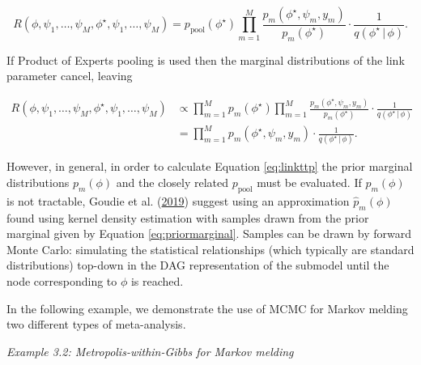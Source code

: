 \documentclass[11pt,]{book}
\begin{document}
\begin{equation}
R(\phi, \psi_1, \ldots, \psi_M, \phi^\star, \psi_1, \ldots, \psi_M) = p_{\mathrm{pool}}(\phi^\star) \prod_{m=1}^M \frac{p_m(\phi^\star, \psi_m, y_m)}{p_m(\phi^\star)} \cdot \frac{1}{q(\phi^\star \, | \, \phi)}. \label{eq:linkttp}
\end{equation}

If Product of Experts pooling is used then the marginal distributions of
the link parameter cancel, leaving

\begin{align}
R(\phi, \psi_1, \ldots, \psi_M, \phi^\star, \psi_1, \ldots, \psi_M) 
&\propto \prod_{m=1}^M p_m(\phi^\star) \prod_{m=1}^M \frac{p_m(\phi^\star, \psi_m, y_m)}{p_m(\phi^\star)} \cdot \frac{1}{q(\phi^\star \, | \, \phi)} \nonumber \\
&= \prod_{m=1}^M p_m(\phi^\star, \psi_m, y_m) \cdot \frac{1}{q(\phi^\star \, | \, \phi)}.
\end{align}

However, in general, in order to calculate Equation \eqref{eq:linkttp}
the prior marginal distributions \(p_m(\phi)\) and the closely related
\(p_{\mathrm{pool}}\) must be evaluated. If \(p_m(\phi)\) is not
tractable, Goudie et al.
(\protect\hyperlink{ref-goudie2019joining}{2019}) suggest using an
approximation \(\hat p_m(\phi)\) found using kernel density estimation
with samples drawn from the prior marginal given by Equation
\eqref{eq:priormarginal}. Samples can be drawn by forward Monte Carlo:
simulating the statistical relationships (which typically are standard
distributions) top-down in the DAG representation of the submodel until
the node corresponding to \(\phi\) is reached.

In the following example, we demonstrate the use of MCMC for Markov
melding two different types of meta-analysis.

\emph{Example 3.2: Metropolis-within-Gibbs for Markov melding}
\end{document}
